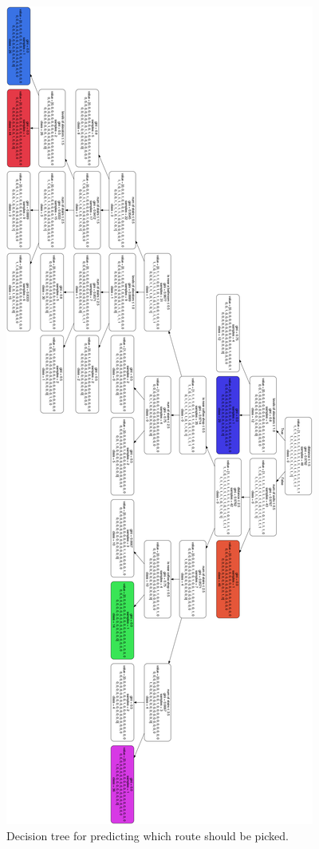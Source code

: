 \documentclass{sigchi}
\begin{document}
\begin{figure}[!h]
\centering
\includegraphics[width=1.0\columnwidth]{pics/routeDT.png}
\caption{Decision tree for predicting which route should be picked.}
\label{fig:dt9}
\end{figure}
\end{document}
